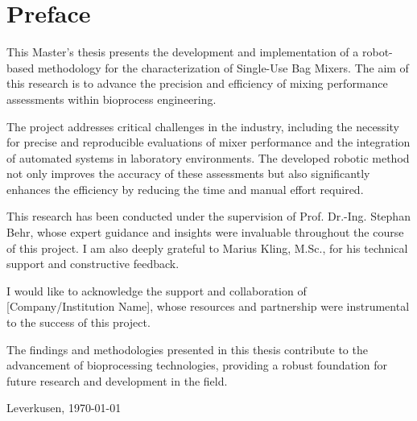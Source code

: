 \chapter*{Preface}

This Master's thesis presents the development and implementation of a robot-based methodology for the characterization of Single-Use Bag Mixers. The aim of this research is to advance the precision and efficiency of mixing performance assessments within bioprocess engineering.

The project addresses critical challenges in the industry, including the necessity for precise and reproducible evaluations of mixer performance and the integration of automated systems in laboratory environments. The developed robotic method not only improves the accuracy of these assessments but also significantly enhances the efficiency by reducing the time and manual effort required.

This research has been conducted under the supervision of Prof. Dr.-Ing. Stephan Behr, whose expert guidance and insights were invaluable throughout the course of this project. I am also deeply grateful to Marius Kling, M.Sc., for his technical support and constructive feedback.

I would like to acknowledge the support and collaboration of [Company/Institution Name], whose resources and partnership were instrumental to the success of this project.

The findings and methodologies presented in this thesis contribute to the advancement of bioprocessing technologies, providing a robust foundation for future research and development in the field.

Leverkusen, \today

